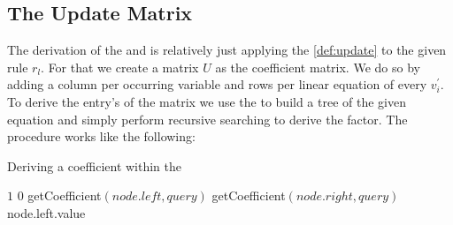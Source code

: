 \subsection{The Update Matrix}
The derivation of the \updatematrix and \updateconstants is relatively just applying the \autoref{def:update} to the given rule $r_l$. For that we create a matrix $U$ as the coefficient matrix. We do so by adding a column per occurring variable and rows per linear equation of every $v^\prime_i$. To derive the entry's of the matrix we use the \rpntree to build a tree of the given equation and simply perform recursive searching to derive the factor. 
The procedure works like the following:
\begin{algorithm}
	\caption{Deriving a coefficient within the \rpntree}
	\label{algo:coefficient}
	\begin{algorithmic}[1]
				\State \Return $1$
			 
				\State \Return $0$
			\EndIf
			\State
			 
					\State \Return getCoefficient$(node.left, query)$
				\Else
					\State \Return getCoefficient$(node.right, query)$
				\EndIf
			\EndIf
			 
					\State \Return node.left.value
				\EndIf				
			\EndIf
		\EndProcedure
	\end{algorithmic}
\end{algorithm}
